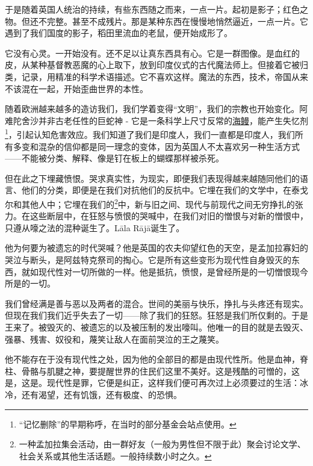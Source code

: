 \begin{scpbox}

于是随着英国人统治的持续，有些东西随之而来，一点一片。起初是影子；红色之物。但还不完整。甚至不成残片。那是某种东西在慢慢地悄然逼近，一点一片。它遇到了我们国度的影子，稻田里流血的老鼠，便开始成形了。

它没有心灵。一开始没有。还不足以让真东西具有心。它是一群图像。是血红的皮，从某种基督教恶魔的心上取下，放到印度仪式的古代魔法师上。但接着它被归类，记录，用精准的科学术语描述。它不喜欢这样。魔法的东西，技术，帝国从来不该混在一起，开始歪曲世界的本性。

随着欧洲越来越多的造访我们，我们学着变得“文明”，我们的宗教也开始变化。阿难陀舍沙并非古老任性的巨蛇神 - 它是一条科学上尺寸反常的\hyperref[chap:SCP-3000]{海鳗}，能产生失忆剂\footnote{“记忆删除”的早期称呼，在当时的部分基金会站点使用。}，引起认知危害效应。我们知道了我们是印度人，我们一直都是印度人，我们所有多变和混杂的信仰都是同一理念的变体，因为英国人不太喜欢另一种生活方式——不能被分类、解释、像是钉在板上的蝴蝶那样被杀死。

但在此之下埋藏愤恨。哭求真实性，为现实，即便我们表现得越来越随同他们的语言、他们的分类，即便是在我们对抗他们的反抗中。它埋在我们的文学中，在泰戈尔和其他人中；它埋在我们的\footnote{一种孟加拉集会活动，由一群好友（一般为男性但不限于此）聚会讨论文学、社会关系或其他生活话题。一般持续数小时之久。}中，新与旧之间、现代与前现代之间无穷挣扎的张力。在这些断层中，在狂怒与愤恨的哭喊中，在我们对旧的憎恨与对新的憎恨中，只遵从嚎之法的混种诞生了。Lāla Rājā诞生了。

他为何要为被遗忘的时代哭喊？他是英国的农夫仰望红色的天空，是孟加拉寡妇的哭泣与断头，是阿兹特克祭司的掏心。它是所有这些变形为现代性自身毁灭的东西，就如现代性对一切所做的一样。他是抵抗，愤恨，是曾经所是的一切憎恨现今所是的一切。

我们曾经满是善与恶以及两者的混合。世间的美丽与快乐，挣扎与头疼还有现实。但现在我们我们近乎失去了一切——除了我们的狂怒。狂怒是我们所仅剩的。于是王来了。被毁灭的、被遗忘的以及被压制的发出嚎叫。他唯一的目的就是去毁灭、强暴、残害、奴役和，蔑笑让敌人在面前哭泣的王之蔑笑。

他不能存在于没有现代性之处，因为他的全部目的都是由现代性所。他是血神，脊柱、骨骼与肌腱之神，要提醒世界的住民们这里不美好。这是残酷的可憎的，这是，这是。现代性是罪，它便是纠正，这样我们便可再次过上必须要过的生活：冰冷，还有渴望，还有饥饿，还有极度、的恐惧。

\end{scpbox}

